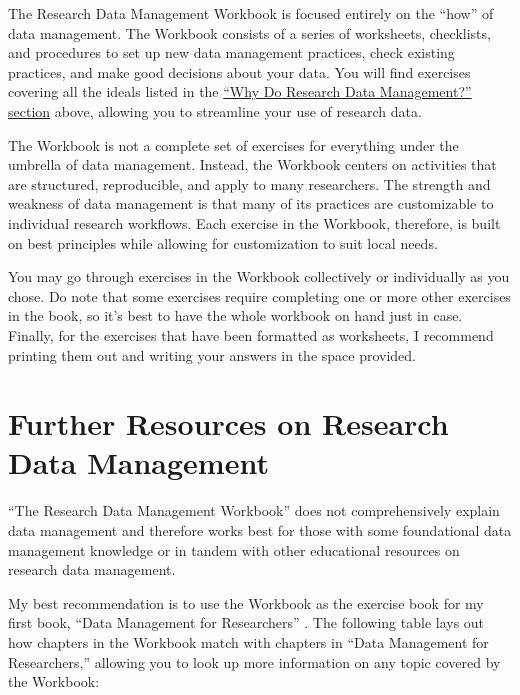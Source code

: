 \documentclass[
]{book}
\begin{document}
The Research Data Management Workbook is focused entirely on the ``how'' of data management. The Workbook consists of a series of worksheets, checklists, and procedures to set up new data management practices, check existing practices, and make good decisions about your data. You will find exercises covering all the ideals listed in the \protect\hyperlink{why-rdm}{``Why Do Research Data Management?'' section} above, allowing you to streamline your use of research data.

The Workbook is not a complete set of exercises for everything under the umbrella of data management. Instead, the Workbook centers on activities that are structured, reproducible, and apply to many researchers. The strength and weakness of data management is that many of its practices are customizable to individual research workflows. Each exercise in the Workbook, therefore, is built on best principles while allowing for customization to suit local needs.

You may go through exercises in the Workbook collectively or individually as you chose. Do note that some exercises require completing one or more other exercises in the book, so it's best to have the whole workbook on hand just in case. Finally, for the exercises that have been formatted as worksheets, I recommend printing them out and writing your answers in the space provided.

\hypertarget{more-rdm}{%
\section{Further Resources on Research Data Management}\label{more-rdm}}

``The Research Data Management Workbook'' does not comprehensively explain data management and therefore works best for those with some foundational data management knowledge or in tandem with other educational resources on research data management.

My best recommendation is to use the Workbook as the exercise book for my first book, ``Data Management for Researchers'' \citep{briney_data_2015}. The following table lays out how chapters in the Workbook match with chapters in ``Data Management for Researchers,'' allowing you to look up more information on any topic covered by the Workbook:
\end{document}
